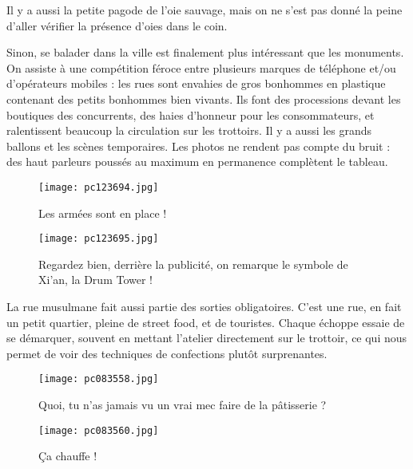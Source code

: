 \documentclass{book}
\begin{document}
Il y a aussi la petite pagode de l'oie sauvage, mais on ne s'est pas donné la peine d'aller vérifier la présence d'oies dans le coin.

Sinon, se balader dans la ville est finalement plus intéressant que les monuments. On assiste à une compétition féroce entre plusieurs marques de téléphone et/ou d'opérateurs mobiles : les rues sont envahies de gros bonhommes en plastique contenant des petits bonhommes bien vivants. Ils font des processions devant les boutiques des concurrents, des haies d'honneur pour les consommateurs, et ralentissent beaucoup la circulation sur les trottoirs. Il y a aussi les grands ballons et les scènes temporaires. Les photos ne rendent pas compte du bruit : des haut parleurs poussés au maximum en permanence complètent le tableau.


\begin{figure}[h]
\centering
\texttt{[image: pc123694.jpg]}
\caption*{Les armées sont en place !}
\end{figure}


\begin{figure}[h]
\centering
\texttt{[image: pc123695.jpg]}
\caption*{Regardez bien, derrière la publicité, on remarque le symbole de Xi'an, la Drum Tower !}
\end{figure}

La rue musulmane fait aussi partie des sorties obligatoires. C'est une rue, en fait un petit quartier, pleine de street food, et de touristes. Chaque échoppe essaie de se démarquer, souvent en mettant l'atelier directement sur le trottoir, ce qui nous permet de voir des techniques de confections plutôt surprenantes.


\begin{figure}[h]
\centering
\texttt{[image: pc083558.jpg]}
\caption*{Quoi, tu n'as jamais vu un vrai mec faire de la pâtisserie ?}
\end{figure}


\begin{figure}[h]
\centering
\texttt{[image: pc083560.jpg]}
\caption*{Ça chauffe !}
\end{figure}
\end{document}
